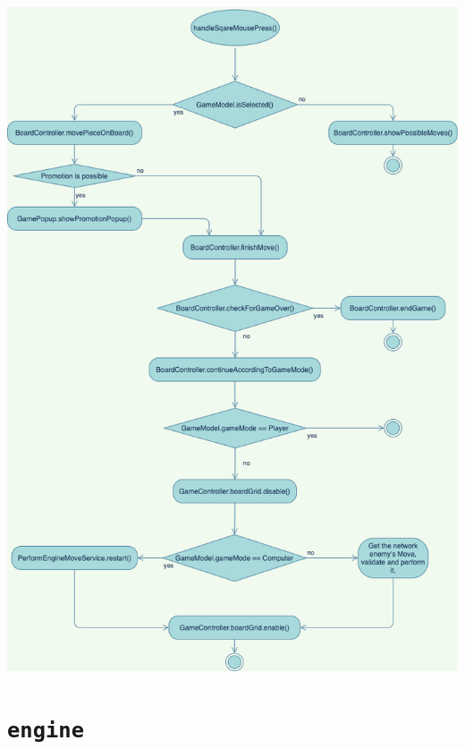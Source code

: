 \documentclass{scrreprt}
\newcommand{\lstinlinejava}[1]{\lstinline[language=java]{#1}}
\newcommand{\lstj}[1]{\lstinlinejava{#1}}
\begin{document}
\includegraphics[width=\linewidth]{ActivityDiagramMove}

\chapter{\lstj{engine}}
\end{document}
